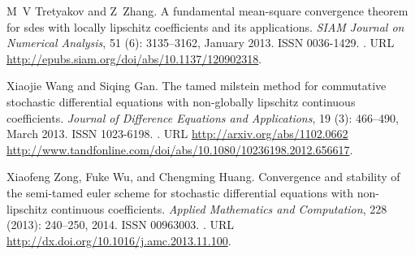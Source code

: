 \documentclass[sort&compress, preprint]{elsarticle}
\theoremstyle{definition}
\theoremstyle{plain}%
\theoremstyle{remark}
\begin{document}
\begin{thebibliography}{36}
M~V Tretyakov and Z~Zhang.
\newblock A fundamental mean-square convergence theorem for sdes with locally
  lipschitz coefficients and its applications.
\newblock \emph{SIAM Journal on Numerical Analysis}, 51 (6):
  3135--3162, January 2013{}.
\newblock ISSN 0036-1429.
\newblock {}.
\newblock URL \url{http://epubs.siam.org/doi/abs/10.1137/120902318}.

Xiaojie Wang and Siqing Gan.
\newblock The tamed milstein method for commutative stochastic differential
  equations with non-globally lipschitz continuous coefficients.
\newblock \emph{Journal of Difference Equations and Applications}, 19
  (3): 466--490, March 2013.
\newblock ISSN 1023-6198.
\newblock {}.
\newblock URL \url{http://arxiv.org/abs/1102.0662
  http://www.tandfonline.com/doi/abs/10.1080/10236198.2012.656617}.

Xiaofeng Zong, Fuke Wu, and Chengming Huang.
\newblock Convergence and stability of the semi-tamed euler scheme for
  stochastic differential equations with non-lipschitz continuous coefficients.
\newblock \emph{Applied Mathematics and Computation}, 228
  (2013): 240--250, 2014.
\newblock ISSN 00963003.
\newblock {}.
\newblock URL \url{http://dx.doi.org/10.1016/j.amc.2013.11.100}.

\end{thebibliography}

\end{document}
